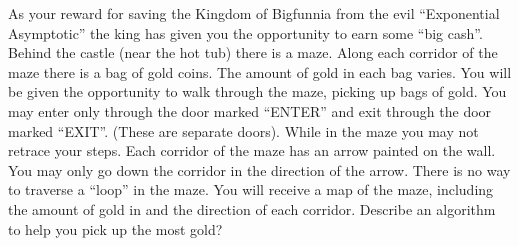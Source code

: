 As your reward for saving the Kingdom of Bigfunnia from the evil
``Exponential Asymptotic'' the king has given you the opportunity to
earn some ``big cash''.  Behind the castle (near the hot tub) there is
a maze.  Along each corridor of the maze there is a bag of gold coins.
The amount of gold in each bag varies.  You will be given the
opportunity to walk through the maze, picking up bags of gold.  You may
enter only through the door marked ``ENTER'' and exit through the door
marked ``EXIT''.  (These are separate doors).  While in the maze you
may not retrace your steps.  Each corridor of the maze has an arrow
painted on the wall.  You may only go down the corridor in the
direction of the arrow.  There is no way to traverse a ``loop'' in the
maze.  You will receive a map of the maze, including the amount of gold
in and the direction of each corridor.  
Describe an algorithm to help you  pick up the most gold?

